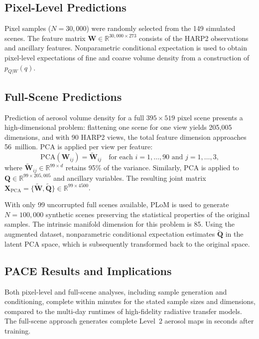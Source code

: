 \documentclass[11pt]{report}
\newcommand{\R}{\mathbb{R}}
\begin{document}
\subsection{Pixel-Level Predictions}

Pixel samples ($N = 30{,}000$) were randomly selected from the 149 simulated scenes. The feature matrix $\mathbf{W} \in \R^{30{,}000 \times 273}$ consists of the HARP2 observations and ancillary features. Nonparametric conditional expectation is used to obtain pixel-level expectations of fine and coarse volume density from a construction of $p_{Q|W}(q)$.

\subsection{Full-Scene Predictions}

Prediction of aerosol volume density for a full $395 \times 519$ pixel scene presents a high-dimensional problem: flattening one scene for one view yields 205,005 dimensions, and with 90 HARP2 views, the total feature dimension approaches 56~million. PCA is applied per view per feature:
\[
\text{PCA}(\mathbf{W}_{ij}) = \tilde{\mathbf{W}}_{ij} \quad \text{for each } i = 1, \ldots, 90 \text{ and } j = 1, \ldots, 3,
\]
where $\tilde{\mathbf{W}}_{ij} \in \R^{99 \times d}$ retains 95\% of the variance. Similarly, PCA is applied to $\mathbf{Q} \in \R^{99 \times 205{,}005}$ and ancillary variables. The resulting joint matrix $\mathbf{X}_{\text{PCA}} = \{\tilde{\mathbf{W}}, \tilde{\mathbf{Q}}\} \in \R^{99 \times 4500}$.

With only 99 uncorrupted full scenes available, PLoM is used to generate $N = 100{,}000$ synthetic scenes preserving the statistical properties of the original samples. The intrinsic manifold dimension for this problem is 85. Using the augmented dataset, nonparametric conditional expectation estimates $\tilde{\mathbf{Q}}$ in the latent PCA space, which is subsequently transformed back to the original space.

\subsection{PACE Results and Implications}

Both pixel-level and full-scene analyses, including sample generation and conditioning, complete within minutes for the stated sample sizes and dimensions, compared to the multi-day runtimes of high-fidelity radiative transfer models. The full-scene approach generates complete Level~2 aerosol maps in seconds after training.
\end{document}
